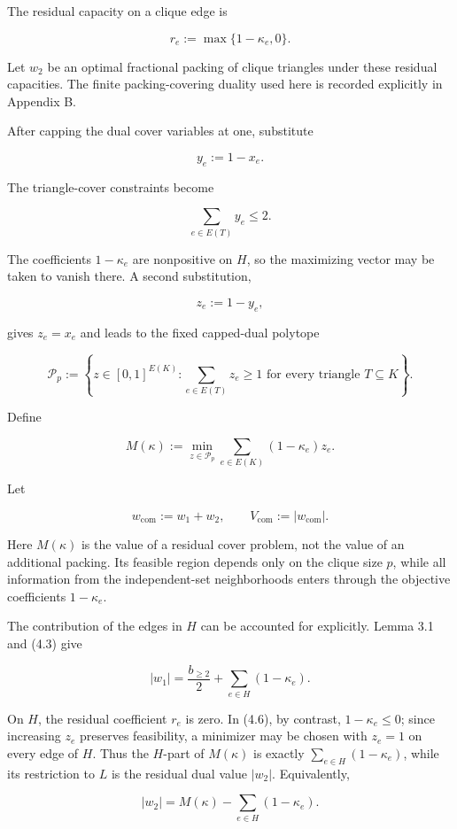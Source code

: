 \documentclass[english,11pt,a4paper]{article}
\begin{document}
The residual capacity on a clique edge is

\[
r_e:=\max\{1-\kappa_e,0\}.
\tag{4.4}
\]

Let \(w_2\) be an optimal fractional packing of clique triangles under
these residual capacities. The finite packing-covering duality used here
is recorded explicitly in Appendix B.

After capping the dual cover variables at one, substitute

\[
y_e:=1-x_e.
\]

The triangle-cover constraints become

\[
\sum_{e\in E(T)}y_e\le2.
\]

The coefficients \(1-\kappa_e\) are nonpositive on \(H\), so the
maximizing vector may be taken to vanish there. A second substitution,

\[
z_e:=1-y_e,
\]

gives \(z_e=x_e\) and leads to the fixed capped-dual polytope

\[
\mathcal P_p
:=
\left\{
z\in[0,1]^{E(K)}:
\sum_{e\in E(T)}z_e\ge1
\text{ for every triangle }T\subseteq K
\right\}.
\tag{4.5}
\]

Define

\[
M(\kappa)
:=
\min_{z\in\mathcal P_p}
\sum_{e\in E(K)}(1-\kappa_e)z_e.
\tag{4.6}
\]

Let

\[
w_{\mathrm{com}}:=w_1+w_2,
\qquad
V_{\mathrm{com}}:=|w_{\mathrm{com}}|.
\]

Here \(M(\kappa)\) is the value of a residual cover problem, not the
value of an additional packing. Its feasible region depends only on the
clique size \(p\), while all information from the independent-set
neighborhoods enters through the objective coefficients \(1-\kappa_e\).

The contribution of the edges in \(H\) can be accounted for explicitly.
Lemma 3.1 and (4.3) give

\[
|w_1|
=
\frac{b_{\ge2}}2+\sum_{e\in H}(1-\kappa_e).
\]

On \(H\), the residual coefficient \(r_e\) is zero. In (4.6), by
contrast, \(1-\kappa_e\le0\); since increasing \(z_e\) preserves
feasibility, a minimizer may be chosen with \(z_e=1\) on every edge of
\(H\). Thus the \(H\)-part of \(M(\kappa)\) is exactly
\(\sum_{e\in H}(1-\kappa_e)\), while its restriction to \(L\) is the
residual dual value \(|w_2|\). Equivalently,

\[
|w_2|=M(\kappa)-\sum_{e\in H}(1-\kappa_e).
\]
\end{document}
